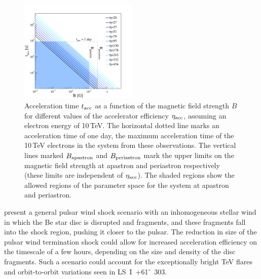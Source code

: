 \documentclass[preprint2]{aastex}
\newcommand{\lsi}{LS~I~+61$^{\circ}$~303}
\newcommand{\tev}{\,TeV}
\begin{document}
\begin{figure}[ht]
\centering
\includegraphics[width=0.5\textwidth]{figs/taccvsB_areas.pdf}
\caption{Acceleration time $t_{\mbox{\scriptsize{acc}}}$ as a function of the magnetic field strength $B$ for different values of the accelerator efficiency $\eta_{\mbox{\scriptsize{acc}}}$, assuming an electron energy of 10\tev{}. The horizontal dotted line marks an acceleration time of one day, the maximum acceleration time of the 10\tev{} electrons in the system from these observations. The vertical lines marked $B_{\mbox{\scriptsize{apastron}}}$ and $B_{\mbox{\scriptsize{periastron}}}$ mark the upper limits on the magnetic field strength at apastron and periastron respectively (these limits are independent of $\eta_{\mbox{\scriptsize{acc}}}$). The shaded regions show the allowed regions of the parameter space for the system at apastron and periastron.}
\label{f:tacc}
\end{figure}


\citet{Paredes-Fortuny2014} present a general pulsar wind shock scenario with an inhomogeneous stellar wind in which the Be star disc is disrupted and fragments, and these fragments fall into the shock region, pushing it closer to the pulsar. The reduction in size of the pulsar wind termination shock could allow for increased acceleration efficiency on the timescale of a few hours, depending on the size and density of the disc fragments. Such a scenario could account for the exceptionally bright TeV flares and orbit-to-orbit variations seen in \lsi{}.
\vspace{2ex}
\end{document}
